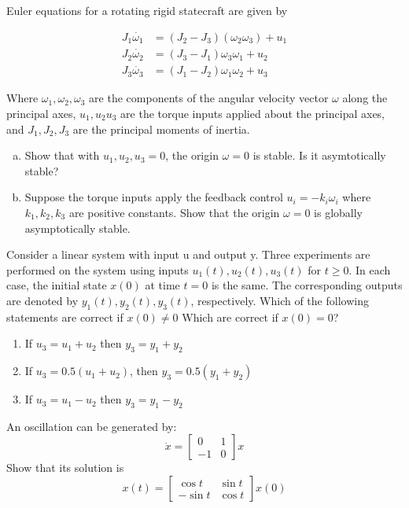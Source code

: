 \documentclass[11pt]{article}
\begin{document}
\soln







Euler equations for a rotating rigid statecraft are given by

\begin{align*}
    J_1 \dot{\omega_1} &= (J_2 - J_3)(\omega_2\omega_3) + u_1\\
    J_2 \dot{\omega_2} &= (J_3 - J_1)\omega_3\omega_1 + u_2\\
    J_3 \dot{\omega_3} &= (J_1 - J_2)\omega_1\omega_2 + u_3
\end{align*}

Where $\omega_1,\omega_2,\omega_3$ are the components of the angular velocity vector $\omega$ along the principal
axes, $u_1, u_2 u_3$ are the torque inputs applied about the principal axes, and $J_1, J_2, J_3$
are the principal moments of inertia.
\begin{enumerate}[(a)]
    \item Show that with $u_1, u_2, u_3 = 0$, the origin $\omega = 0$ is stable. Is it asymtotically stable?
    \item Suppose the torque inputs apply the feedback control $u_i = -k_i\omega_i$
    where $k_1, k_2, k_3$ are positive constants. Show that the origin $\omega = 0$ is globally
    asymptotically stable.
\end{enumerate}


Consider a linear system with input u and output y. Three experiments are
performed on the system using inputs $u_1(t), u_2(t), u_3(t)$ for $t \geq 0$. In each case, the initial
state $x(0)$ at time $t = 0$ is the same. The corresponding outputs are denoted by $y_1(t), y_2(t)
, y_3(t)$, respectively. Which of the following statements are correct if $x(0) \neq 0$ Which
are correct if $x(0) = 0$?

\begin{enumerate}
    \item If $u_3 = u_1 + u_2$ then $y_3 = y_1 + y_2$
    \item If $u_3 = 0.5 (u_1 + u_2)$, then $y_3 = 0.5(y_1 + y_2)$
    \item If $u_3 = u_1 - u_2$ then $y_3 = y_1 - y_2$ 
\end{enumerate}


\soln






An oscillation can be generated by:
$$
\dot{x} = \begin{bmatrix}
    0 & 1\\-1 &0
\end{bmatrix}x
$$
Show that its solution is $$
x(t) = \begin{bmatrix}
    \cos t & \sin t \\ - \sin t & \cos t
\end{bmatrix}x(0)
$$
\end{document}
